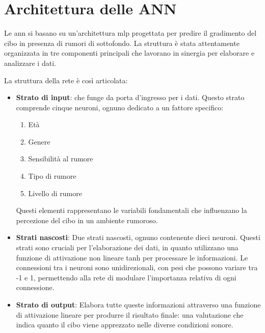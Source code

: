\section{Architettura delle ANN}
\noindent

Le \gls{ann} si basano su un'architettura \gls{mlp} progettata per predire il gradimento del cibo in presenza di rumori di sottofondo. La struttura è stata attentamente organizzata in tre componenti principali che lavorano in sinergia per elaborare e analizzare i dati.

La struttura della rete è così articolata:

\begin{itemize}
    \item \textbf{Strato di input}: che funge da porta d'ingresso per i dati. Questo strato comprende cinque neuroni, ognuno dedicato a un fattore specifico:
    \begin{enumerate}
        \item Età
        \item Genere
        \item Sensibilità al rumore
        \item Tipo di rumore
        \item Livello di rumore
    \end{enumerate}

    Questi elementi rappresentano le variabili fondamentali che influenzano la percezione del cibo in un ambiente rumoroso.
    
    \item \textbf{Strati nascosti}: Due strati nascosti, ognuno contenente dieci neuroni. Questi strati sono cruciali per l'elaborazione dei dati, in quanto utilizzano una funzione di attivazione non lineare \gls{tanh} per processare le informazioni. Le connessioni tra i neuroni sono unidirezionali, con pesi che possono variare tra -1 e 1, permettendo alla rete di modulare l'importanza relativa di ogni connessione.
    
    \item \textbf{Strato di output}: Elabora tutte queste informazioni attraverso una funzione di attivazione lineare per produrre il risultato finale: una valutazione che indica quanto il cibo viene apprezzato nelle diverse condizioni sonore.
\end{itemize}

